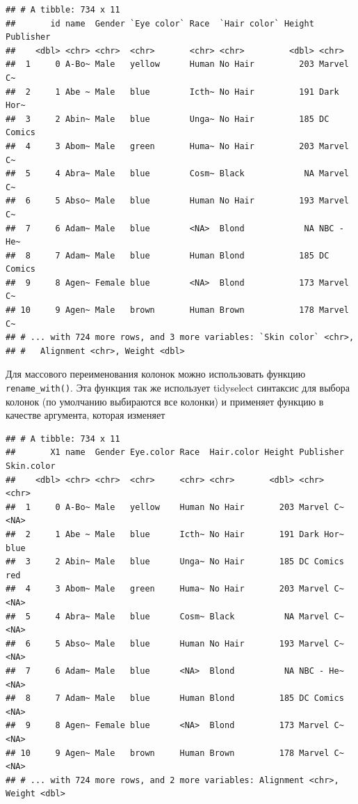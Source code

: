 \documentclass[]{book}
\newenvironment{Shaded}{\begin{snugshade}}{\end{snugshade}}
\newcommand{\KeywordTok}[1]{\textcolor[rgb]{0.13,0.29,0.53}{\textbf{#1}}}
\newcommand{\StringTok}[1]{\textcolor[rgb]{0.31,0.60,0.02}{#1}}
\newcommand{\OperatorTok}[1]{\textcolor[rgb]{0.81,0.36,0.00}{\textbf{#1}}}
\newcommand{\NormalTok}[1]{#1}
\begin{document}
\begin{verbatim}
## # A tibble: 734 x 11
##       id name  Gender `Eye color` Race  `Hair color` Height Publisher
##    <dbl> <chr> <chr>  <chr>       <chr> <chr>         <dbl> <chr>    
##  1     0 A-Bo~ Male   yellow      Human No Hair         203 Marvel C~
##  2     1 Abe ~ Male   blue        Icth~ No Hair         191 Dark Hor~
##  3     2 Abin~ Male   blue        Unga~ No Hair         185 DC Comics
##  4     3 Abom~ Male   green       Huma~ No Hair         203 Marvel C~
##  5     4 Abra~ Male   blue        Cosm~ Black            NA Marvel C~
##  6     5 Abso~ Male   blue        Human No Hair         193 Marvel C~
##  7     6 Adam~ Male   blue        <NA>  Blond            NA NBC - He~
##  8     7 Adam~ Male   blue        Human Blond           185 DC Comics
##  9     8 Agen~ Female blue        <NA>  Blond           173 Marvel C~
## 10     9 Agen~ Male   brown       Human Brown           178 Marvel C~
## # ... with 724 more rows, and 3 more variables: `Skin color` <chr>,
## #   Alignment <chr>, Weight <dbl>
\end{verbatim}

Для массового переименования колонок можно использовать функцию
\texttt{rename\_with()}. Эта функция так же использует tidyselect
синтаксис для выбора колонок (по умолчанию выбираются все колонки) и
применяет функцию в качестве аргумента, которая изменяет

\begin{Shaded}
\end{Shaded}

\begin{verbatim}
## # A tibble: 734 x 11
##       X1 name  Gender Eye.color Race  Hair.color Height Publisher Skin.color
##    <dbl> <chr> <chr>  <chr>     <chr> <chr>       <dbl> <chr>     <chr>     
##  1     0 A-Bo~ Male   yellow    Human No Hair       203 Marvel C~ <NA>      
##  2     1 Abe ~ Male   blue      Icth~ No Hair       191 Dark Hor~ blue      
##  3     2 Abin~ Male   blue      Unga~ No Hair       185 DC Comics red       
##  4     3 Abom~ Male   green     Huma~ No Hair       203 Marvel C~ <NA>      
##  5     4 Abra~ Male   blue      Cosm~ Black          NA Marvel C~ <NA>      
##  6     5 Abso~ Male   blue      Human No Hair       193 Marvel C~ <NA>      
##  7     6 Adam~ Male   blue      <NA>  Blond          NA NBC - He~ <NA>      
##  8     7 Adam~ Male   blue      Human Blond         185 DC Comics <NA>      
##  9     8 Agen~ Female blue      <NA>  Blond         173 Marvel C~ <NA>      
## 10     9 Agen~ Male   brown     Human Brown         178 Marvel C~ <NA>      
## # ... with 724 more rows, and 2 more variables: Alignment <chr>, Weight <dbl>
\end{verbatim}
\end{document}
